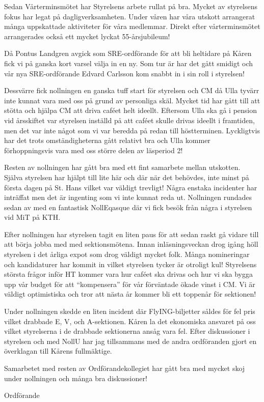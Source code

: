 \documentclass[../_main/handlingar.tex]{subfiles}
\begin{document}

Sedan Vårterminsmötet har Styrelsens arbete rullat på bra. Mycket av styrelsens fokus har legat på dagligverksamheten. Under våren har våra utskott arrangerat många uppskattade aktiviteter för våra medlemmar. Direkt efter vårterminsmötet arrangerades också ett mycket lyckat 55-årsjubileum!

Då Pontus Landgren avgick som SRE-ordförande för att bli heltidare på Kåren fick vi på ganska kort varsel välja in en ny. Som tur är har det gått smidigt och vår nya SRE-ordförande Edvard Carlsson kom snabbt in i sin roll i styrelsen!

Dessvärre fick nollningen en ganska tuff start för styrelsen och CM då Ulla tyvärr inte kunnat vara med oss på grund av personliga skäl. Mycket tid har gått till att stötta och hjälpa CM att driva caféet helt ideellt. Eftersom Ulla ska gå i pension vid årsskiftet var styrelsen inställd på att caféet skulle drivas ideellt i framtiden, men det var inte något som vi var beredda på redan till höstterminen. Lyckligtvis har det trots omständigheterna gått relativt bra och Ulla kommer förhoppningsvis vara med oss större delen av läsperiod 2!

Resten av nollningen har gått bra med ett fint samarbete mellan utskotten. Själva styrelsen har hjälpt till lite här och där när det behövdes, inte minst på första dagen på St. Hans vilket var väldigt trevligt! Några enstaka incidenter har inträffat men det är ingenting som vi inte kunnat reda ut. Nollningen rundades sedan av med en fantastisk NollEqasque där vi fick besök från några i styrelsen vid MiT på KTH.

Efter nollningen har styrelsen tagit en liten paus för att sedan raskt gå vidare till att börja jobba med med sektionsmötena. Innan inläsningsveckan drog igång höll styrelsen i det årliga expot som drog väldigt mycket folk. Många nomineringar och kandidaturer har kommit in vilket styrelsen tycker är otroligt kul! Styrelsens största frågor inför HT kommer vara hur caféet ska drivas och hur vi ska bygga upp vår budget för att ``kompensera'' för vår förväntade ökade vinst i CM. Vi är väldigt optimistiska och tror att nästa år kommer bli ett toppenår för sektionen!

Under nollningen skedde en liten incident där FlyING-biljetter såldes för fel pris vilket drabbade E, V, och A-sektionen. Kåren la det ekonomiska ansvaret på oss vilket styrelserna i de drabbade sektionerna ansåg vara fel. Efter diskussioner i styrelsen och med NollU har jag tillsammans med de andra ordföranden gjort en överklagan till Kårens fullmäktige.

Samarbetet med resten av Ordförandekollegiet har gått bra med mycket skoj under nollningen och många bra diskussioner!

\begin{signatures}{1}
    \mvh
    \signature{\ordf}{Ordförande}
\end{signatures}
\end{document}
